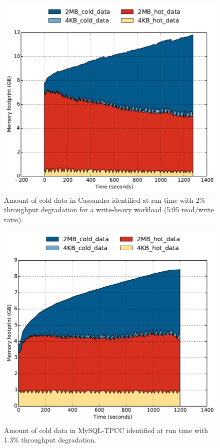 \begin{figure}[t]
\centering
\includegraphics[width=1.0\columnwidth]{asplos2017/figures/cassandra-new-set-policy-kstaled10-sample5-period3-capacity_over_time.pdf}
\caption{Amount of cold data in Cassandra identified at run time with 2\%
throughput degradation for a write-heavy workload (5:95 read/write ratio).}
\label{fig:cassandra-capacity}
\end{figure}

\begin{figure}[t]
\centering
\includegraphics[width=1.0\columnwidth]{asplos2017/figures/tpcc-clipped-new-policy-capacity_over_time.pdf}
\caption{Amount of cold data in MySQL-TPCC identified at run time with 1.3\%
throughput degradation.}
\label{fig:tpcc-capacity}
\end{figure}

